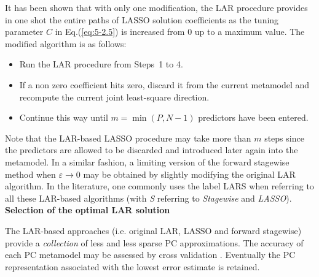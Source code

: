 {  It has been shown that with only one modification, the LAR procedure provides in one shot the entire paths of LASSO solution coefficients as the tuning parameter $C$ in Eq.(\ref{eq:5-2.5}) is increased from 0 up to a maximum value. The modified algorithm is as follows:
  \begin{itemize}
  \item Run the LAR procedure from Steps~1 to 4.
  \item If a non zero coefficient hits zero, discard it from the current metamodel and recompute the current joint least-square direction.
  \item Continue this way until $m = \min(P,N-1)$ predictors have been entered.
  \end{itemize}
  Note that the LAR-based LASSO procedure may take more than $m$ steps since the predictors are allowed to be discarded and introduced later again into the metamodel. In a similar fashion, a limiting version of the forward stagewise method when $\varepsilon \to 0$ may be obtained by slightly modifying the original LAR algorithm. In the literature, one commonly uses the label LARS when referring to all these LAR-based algorithms (with \emph{S} referring to \emph{Stagewise} and \emph{LASSO}). \\

  \textbf{Selection of the optimal LAR solution} \vspace{2mm}

  The LAR-based approaches (i.e. original LAR, LASSO and forward stagewise) provide a \emph{collection} of less and less sparse PC approximations. The accuracy of each PC metamodel may be assessed by cross validation . Eventually the PC representation associated with the lowest error estimate is retained.
}


